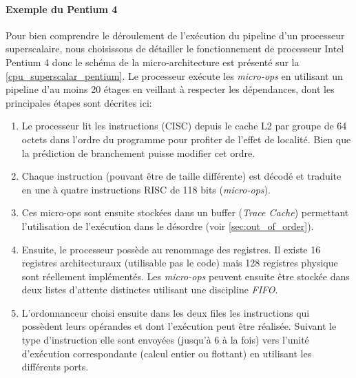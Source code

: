 \paragraph{Exemple du Pentium 4}
Pour bien comprendre le déroulement de l'exécution du pipeline d'un processeur superscalaire, nous choisissons de détailler le fonctionnement de processeur Intel Pentium 4 \cite{stallings2003organisation} donc le schéma de la micro-architecture est présenté sur la \autoref{cpu_superscalar_pentium}. Le processeur exécute les \textit{micro-ops} en utilisant un pipeline d'au moins 20 étages en veillant à respecter les dépendances, dont les principales étapes sont décrites ici: 

\begin{enumerate}
    \item Le processeur lit les instructions (CISC) depuis le cache L2 par groupe de 64 octets dans l'ordre du programme pour profiter de l'effet de localité. Bien que la prédiction de branchement puisse modifier cet ordre. 
    \item Chaque instruction (pouvant être de taille différente) est décodé et traduite en une à quatre instructions RISC de 118 bits (\textit{micro-ops}). \item Ces micro-ops sont ensuite stockées dans un buffer (\textit{Trace Cache}) permettant l'utilisation de l'exécution dans le désordre (voir \autoref{sec:out_of_order}).
    \item Ensuite, le processeur possède au renommage des registres. Il existe 16 registres architecturaux (utilisable pas le code) mais 128 registres physique sont réellement implémentés. Les \textit{micro-ops} peuvent ensuite être stockée dans deux listes d'attente distinctes utilisant une discipline \textit{FIFO}.
    \item L'ordonnanceur choisi ensuite dans les deux files les instructions qui possèdent leurs opérandes et dont l'exécution peut être réalisée. Suivant le type d'instruction elle sont envoyées (jusqu'à 6 à la fois) vers l'unité d'exécution correspondante (calcul entier ou flottant) en utilisant les différents ports. 
\end{enumerate}
     


